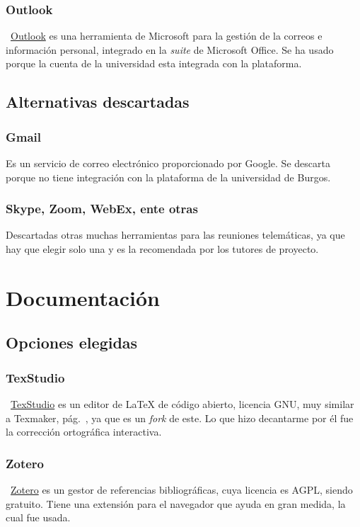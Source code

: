 \subsubsection{Outlook}
~\href{https://www.microsoft.com/es-es/microsoft-365/outlook/email-and-calendar-software-microsoft-outlook}{Outlook} es una herramienta de Microsoft para la gestión de la correos e información personal, integrado en la \emph{suite} de Microsoft Office. Se ha usado porque la cuenta de la universidad esta integrada con la plataforma.

\subsection{Alternativas descartadas}

\subsubsection{Gmail}
Es un servicio de correo electrónico proporcionado por Google. Se descarta porque no tiene integración con la plataforma de la universidad de Burgos.

\subsubsection{Skype, Zoom, WebEx, ente otras}
Descartadas otras muchas herramientas para las reuniones telemáticas, ya que hay que elegir solo una y es la recomendada por los tutores de proyecto.
\section{Documentación}

\subsection{Opciones elegidas}

\subsubsection{TexStudio}
~\href{https://www.texstudio.org/}{TexStudio} es un editor de \LaTeX{} de código abierto, licencia GNU, muy similar a Texmaker, pág.~\pageref{textmaker}, ya que es un \emph{fork} de este. Lo que hizo decantarme por él fue la corrección ortográfica interactiva.

\subsubsection{Zotero}
~\href{https://www.zotero.org/}{Zotero} es un gestor de referencias bibliográficas, cuya licencia es AGPL, siendo gratuito. Tiene una extensión para el navegador que ayuda en gran medida, la cual fue usada.

